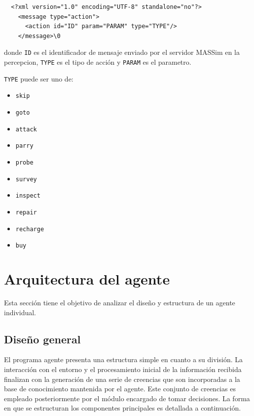   \begin{verbatim}
  <?xml version="1.0" encoding="UTF-8" standalone="no"?>
    <message type="action">
      <action id="ID" param="PARAM" type="TYPE"/>
    </message>\0
  \end{verbatim}
  
  donde {\tt ID} es el identificador de mensaje enviado por el servidor
  MASSim en la percepcion, {\tt TYPE} es el tipo de acción y {\tt PARAM}
  es el parametro. 
  
  {\tt TYPE} puede ser uno de:
  
  \begin{itemize}
  \item \tt{skip}
  \item \tt{goto}
  \item \tt{attack}
  \item \tt{parry}
  \item \tt{probe}
  \item \tt{survey}
  \item \tt{inspect}
  \item \tt{repair}
  \item \tt{recharge}
  \item \tt{buy}
  \end{itemize}

\section{Arquitectura del agente}
 \label{sec:arquitectura_agente}

 Esta sección tiene el objetivo de analizar el diseño y estructura de 
 un agente individual.

\subsection{Diseño general}
 \label{sub:diseno_general}
 
 El programa agente presenta una estructura simple en cuanto a su
 división.
 La interacción con el entorno y el procesamiento inicial de la
 información recibida finalizan con la generación de una serie de
 creencias que son incorporadas a la base de conocimiento mantenida por
 el agente.
 Este conjunto de creencias es empleado posteriormente por el módulo
 encargado de tomar decisiones.
 La forma en que se estructuran los componentes principales es
 detallada a continuación.

